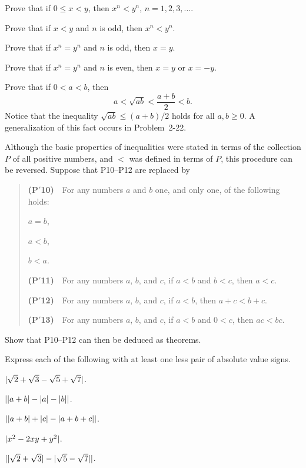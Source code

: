 \begin{letters}
\item Prove that if $0 \leq x < y$, then $x^n < y^n$, $n = 1, 2, 3, \dots$.
\item Prove that if $x < y$ and $n$ is odd, then $x^n < y^n$.
\item Prove that if $x^n = y^n$ and $n$ is odd, then $x = y$.
\item Prove that if $x^n = y^n$ and $n$ is even, then $x = y$ or $x = -y$.
\end{letters}

 Prove that if $0 < a < b$, then
\[ a < \sqrt{ab} < \frac{a+b}{2} < b. \]
Notice that the inequality $\sqrt{ab} \leq (a+b)/2$ holds for all $a, b \geq 0$.
A generalization of this fact occurs in Problem~2-22.

 Although the basic properties of inequalities were stated in terms
of the collection $P$ of all positive numbers, and $<$ was defined in terms of
$P$, this procedure can be reversed. Suppose that P10--P12 are replaced by
\begin{quote}
\textbf{(P$'$10)}\ \ For any numbers $a$ and $b$ one, and only one, of the
following holds:
\begin{romans}
\item $a = b$,
\item $a < b$,
\item $b < a$.
\end{romans}

\textbf{(P$'$11)}\ \ For any numbers $a$, $b$, and $c$, if $a < b$ and
$b < c$, then $a < c$.

\textbf{(P$'$12)}\ \ For any numbers $a$, $b$, and $c$, if $a < b$, then
$a + c < b + c$.

\textbf{(P$'$13)}\ \ For any numbers $a$, $b$, and $c$, if $a < b$ and
$0 < c$, then $ac < bc$.
\end{quote}
Show that P10--P12 can then be deduced as theorems.

 Express each of the following with at least one less pair of
absolute value signs.
\begin{romans}
\item $\lvert\sqrt{2} + \sqrt{3} - \sqrt{5} + \sqrt{7}\rvert$.
\item $\lvert\lvert a+b\rvert - \lvert a\rvert - \lvert b\rvert\rvert$.
\item $\lvert\lvert a+b\rvert + \lvert c\rvert - \lvert a+b+c\rvert\rvert$.
\item $\lvert x^2 - 2xy + y^2\rvert$.
\item $\lvert\lvert\sqrt{2} + \sqrt{3}\rvert - \lvert\sqrt{5} - \sqrt{7}\rvert\rvert$.
\end{romans}

